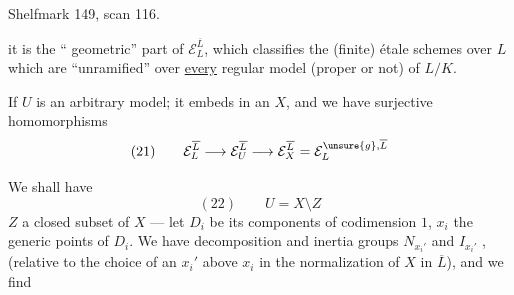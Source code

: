 Shelfmark 149, scan 116.


it is the `` geometric'' part of $\mathcal E_L^{\overline L}$,    which classifies the (finite) étale schemes over $L$ which are ``unramified'' over \uline{every}  regular model (proper or not) of $L/K$.


If $U$ is an arbitrary model; it embeds in an $X$, and we have surjective homomorphisms
\[
(21)\qquad \mathcal E_L^{\overline L}\longrightarrow\mathcal E_U^{\overline L}\longrightarrow\mathcal E_X^{\overline L}=\mathcal E_L^{\unsure{g},\overline L}
\]

We shall have 
\[
(22)\qquad U=X\setminus Z
\]
$Z$ a closed subset of $X$ --- let $D_i$ be its components of codimension $1$, $x_i$ the generic points of $D_i$. We have decomposition and inertia groups $N_{x_i'}$ and $I_{x_i'}$ , (relative to the choice of an $x_i'$ above $x_i$ in the normalization of $X$ in $\overline L$), and we find

